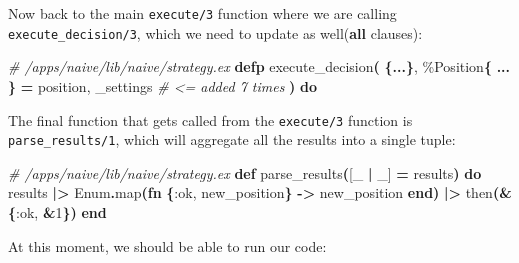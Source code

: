 \documentclass[
  oneside]{book}
\newenvironment{Shaded}{\begin{snugshade}}{\end{snugshade}}
\newcommand{\CommentTok}[1]{\textcolor[rgb]{0.56,0.35,0.01}{\textit{#1}}}
\newcommand{\ConstantTok}[1]{\textcolor[rgb]{0.56,0.35,0.01}{#1}}
\newcommand{\DecValTok}[1]{\textcolor[rgb]{0.00,0.00,0.81}{#1}}
\newcommand{\FunctionTok}[1]{\textcolor[rgb]{0.13,0.29,0.53}{\textbf{#1}}}
\newcommand{\KeywordTok}[1]{\textcolor[rgb]{0.13,0.29,0.53}{\textbf{#1}}}
\newcommand{\NormalTok}[1]{#1}
\newcommand{\OperatorTok}[1]{\textcolor[rgb]{0.81,0.36,0.00}{\textbf{#1}}}
\newcommand{\OtherTok}[1]{\textcolor[rgb]{0.56,0.35,0.01}{#1}}
\newcommand{\VariableTok}[1]{\textcolor[rgb]{0.00,0.00,0.00}{#1}}
\begin{document}
\newpage

Now back to the main \texttt{execute/3} function where we are calling \texttt{execute\_decision/3}, which we need to update as well(\textbf{all} clauses):

\begin{Shaded}
\begin{Highlighting}[]
  \CommentTok{\# /apps/naive/lib/naive/strategy.ex}
  \KeywordTok{defp}\NormalTok{ execute\_decision}\FunctionTok{(}
         \FunctionTok{\{}\OperatorTok{...}\FunctionTok{\}}\NormalTok{,}
\NormalTok{         \%}\ConstantTok{Position}\FunctionTok{\{}
           \OperatorTok{...}
         \FunctionTok{\}} \OperatorTok{=}\NormalTok{ position,}
\NormalTok{         \_settings  }\CommentTok{\# \textless{}= added 7 times}
       \FunctionTok{)} \KeywordTok{do}
\end{Highlighting}
\end{Shaded}

The final function that gets called from the \texttt{execute/3} function is \texttt{parse\_results/1}, which will aggregate all the results into a single tuple:

\begin{Shaded}
\begin{Highlighting}[]
  \CommentTok{\# /apps/naive/lib/naive/strategy.ex}
  \KeywordTok{def}\NormalTok{ parse\_results}\FunctionTok{(}\OtherTok{[}\NormalTok{\_ }\OperatorTok{|}\NormalTok{ \_}\OtherTok{]} \OperatorTok{=}\NormalTok{ results}\FunctionTok{)} \KeywordTok{do}
\NormalTok{    results}
    \OperatorTok{|\textgreater{}} \ConstantTok{Enum}\OperatorTok{.}\NormalTok{map}\FunctionTok{(}\KeywordTok{fn} \FunctionTok{\{}\VariableTok{:ok}\NormalTok{, new\_position}\FunctionTok{\}} \OperatorTok{{-}\textgreater{}}\NormalTok{ new\_position }\KeywordTok{end}\FunctionTok{)}
    \OperatorTok{|\textgreater{}}\NormalTok{ then}\FunctionTok{(}\OperatorTok{\&}\FunctionTok{\{}\VariableTok{:ok}\NormalTok{, }\OperatorTok{\&}\DecValTok{1}\FunctionTok{\})}
  \KeywordTok{end}
\end{Highlighting}
\end{Shaded}

At this moment, we should be able to run our code:
\end{document}

